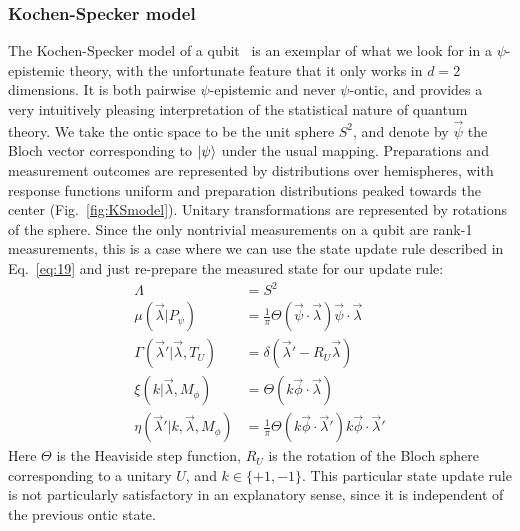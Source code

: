 \documentclass[%
 reprint, onecolumn, 12pt,
superscriptaddress,
nofootinbib,
 prx, 
]{quantumarticle}
\begin{document}
\subsubsection{Kochen-Specker model}
\label{sec:kochen-specker-model}
The Kochen-Specker model of a
qubit~\cite{KochenProblemHiddenVariables1967,Leiferquantumstatereal2014}
is an exemplar of what we look for in a $\psi$-epistemic theory, with
the unfortunate feature that it only works in $d=2$ dimensions. It is
both pairwise $\psi$-epistemic and never $\psi$-ontic, and provides a
very intuitively pleasing interpretation of the statistical nature of
quantum theory. We take the ontic space to be the unit sphere $S^2$,
and denote by $\vec\psi$ the Bloch vector corresponding to $\ket\psi$
under the usual mapping. Preparations and measurement outcomes are
represented by distributions over hemispheres, with response functions
uniform and preparation distributions peaked towards the center
(Fig.~\ref{fig:KSmodel}). Unitary transformations are represented by
rotations of the sphere. Since the only nontrivial measurements on a
qubit are rank-1 measurements, this is a case where we can use the
state update rule described in Eq.~\ref{eq:19} and just re-prepare the
measured state for our update rule:
\begin{align}
  \Lambda
  &= S^2\nonumber\\
  \mu(\vec\lambda|P_\psi)
  &=\frac{1}{\pi}\Theta(\vec\psi\cdot\vec\lambda)\vec\psi\cdot\vec\lambda\nonumber\\
  \Gamma(\vec\lambda'|\vec\lambda,T_U)
  &= \delta(\vec\lambda'-R_U\vec\lambda)\nonumber\\
  \xi(k|\vec\lambda,M_\phi)
  &= \Theta(k\vec\phi\cdot\vec\lambda)\nonumber\\
  \eta(\vec\lambda'|k,\vec\lambda,M_\phi)
  &= \frac{1}{\pi}\Theta(k\vec\phi\cdot\vec\lambda')k\vec\phi\cdot\vec\lambda'
\end{align}
Here $\Theta$ is the Heaviside step function, $R_U$ is the rotation of
the Bloch sphere corresponding to a unitary $U$, and
$k\in\{+1,-1\}$. This particular state update rule is not particularly
satisfactory in an explanatory sense, since it is independent of the
previous ontic state.
\end{document}
